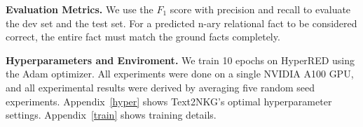\documentclass{article} \usepackage{iclr2024_conference,times}
\begin{document}
\textbf{Evaluation Metrics. }
We use the $F_1$ score with precision and recall to evaluate the dev set and the test set. For a predicted n-ary relational fact to be considered correct, the entire fact must match the ground facts completely.

\textbf{Hyperparameters and Enviroment. }
We train 10 epochs on HyperRED using the Adam optimizer. All experiments were done on a single NVIDIA A100 GPU, and all experimental results were derived by averaging five random seed experiments. Appendix~\ref{hyper} shows Text2NKG's optimal hyperparameter settings. Appendix~\ref{train} shows training details.


\begin{table*}[t]
\centering
\scriptsize
{}
\end{table*}
\end{document}
